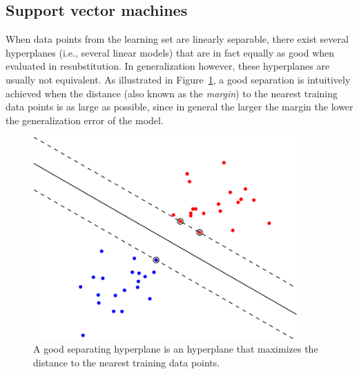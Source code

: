 \subsection{Support vector machines}

When data points from the learning set are linearly separable, there exist
several hyperplanes (i.e., several linear models) that are in fact equally as good when evaluated in resubstitution. In
generalization however, these hyperplanes are usually not equivalent. As illustrated in
Figure~\ref{fig:hyperplane}, a good separation is intuitively achieved when the
distance (also known as the \textit{margin}) to the nearest training data
points is as large as possible, since in general the larger the margin the lower the
generalization error of the model.

\begin{figure}
    \centering
    \includegraphics[width=0.9\textwidth]{figures/ch2_hyperplane.pdf}
    \caption{A good separating hyperplane is an hyperplane that maximizes the distance to the nearest training data points.}
    \label{fig:hyperplane}
\end{figure}

